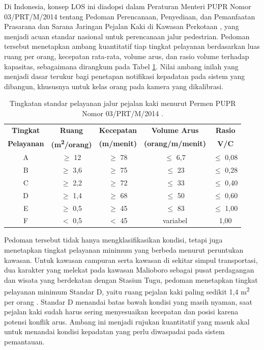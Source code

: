 Di Indonesia, konsep LOS ini diadopsi dalam Peraturan Menteri PUPR Nomor 03/PRT/M/2014 
tentang Pedoman Perencanaan, Penyediaan, dan Pemanfaatan Prasarana dan Sarana Jaringan 
Pejalan Kaki di Kawasan Perkotaan \cite{pupr2014pedoman}, yang menjadi acuan standar 
nasional untuk perencanaan jalur pedestrian. Pedoman tersebut menetapkan ambang kuantitatif 
tiap tingkat pelayanan berdasarkan luas ruang per orang, kecepatan rata-rata, volume arus, 
dan rasio volume terhadap kapasitas, sebagaimana dirangkum pada Tabel \ref{tab:los}. Nilai 
ambang inilah yang menjadi dasar terukur bagi penetapan notifikasi kepadatan pada sistem 
yang dibangun, khususnya untuk kelas orang pada kamera yang dikalibrasi.

\begin{table}[h]
    \centering
    \caption{Tingkatan standar pelayanan jalur pejalan kaki menurut Permen PUPR Nomor 03/PRT/M/2014 \cite{pupr2014pedoman}.}
    \label{tab:los}
    \begin{tabular}{|c|c|c|c|c|}
        \hline
        \textbf{Tingkat} & \textbf{Ruang} & \textbf{Kecepatan} & \textbf{Volume Arus} & \textbf{Rasio} \\
        \textbf{Pelayanan} & \textbf{(m\textsuperscript{2}/orang)} & \textbf{(m/menit)} & \textbf{(orang/m/menit)} & \textbf{V/C} \\
        \hline \hline
        A & $\geq$ 12 & $\geq$ 78 & $\leq$ 6,7 & $\leq$ 0,08 \\
        B & $\geq$ 3,6 & $\geq$ 75 & $\leq$ 23 & $\leq$ 0,28 \\
        C & $\geq$ 2,2 & $\geq$ 72 & $\leq$ 33 & $\leq$ 0,40 \\
        D & $\geq$ 1,4 & $\geq$ 68 & $\leq$ 50 & $\leq$ 0,60 \\
        E & $\geq$ 0,5 & $\geq$ 45 & $\leq$ 83 & $\leq$ 1,00 \\
        F & $<$ 0,5 & $<$ 45 & variabel & 1,00 \\
        \hline
    \end{tabular}
\end{table}

Pedoman tersebut tidak hanya mengklasifikasikan kondisi, tetapi juga menetapkan tingkat 
pelayanan minimum yang berbeda menurut peruntukan kawasan. Untuk kawasan campuran serta 
kawasan di sekitar simpul transportasi, dua karakter yang melekat pada kawasan Malioboro 
sebagai pusat perdagangan dan wisata yang berdekatan dengan Stasiun Tugu, pedoman menetapkan 
tingkat pelayanan minimum Standar D, yaitu ruang pejalan kaki paling sedikit 1,4 
m\textsuperscript{2} per orang \cite{pupr2014pedoman}. Standar D menandai batas bawah 
kondisi yang masih nyaman, saat pejalan kaki sudah harus sering menyesuaikan kecepatan dan 
posisi karena potensi konflik arus. Ambang ini menjadi rujukan kuantitatif yang masuk akal 
untuk menandai kondisi kepadatan yang perlu diwaspadai pada sistem pemantauan.


